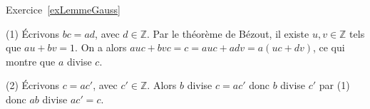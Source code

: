 \documentclass[11pt,a4paper]{article}
\newcommand{\Z}{\mathbb{Z}}
\begin{document}
Exercice~\ref{exLemmeGauss}

(1) Écrivons $bc=ad$, avec $d\in \Z$. Par le théorème de Bézout, il existe $u,v\in \Z$ tels que $au+bv=1$. On a alors $auc+bvc=c=auc+adv=a(uc+dv)$, ce qui montre que $a$ divise $c$.

(2) Écrivons $c=ac'$, avec $c'\in \Z$. Alors $b$ divise $c=ac'$ donc $b$ divise $c'$ par (1) donc $ab$ divise $ac'=c$.
\end{document}
